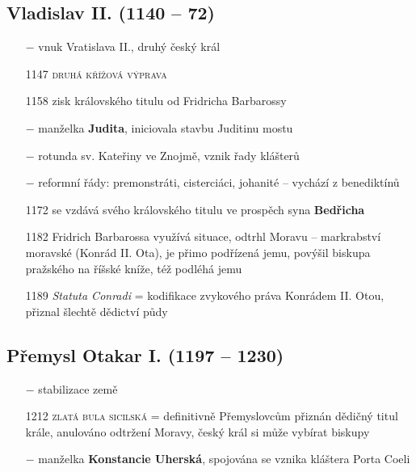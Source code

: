 \documentclass{article}
\begin{document}
\subsection*{Vladislav II. (1140 -- 72)}
\begin{itemize}
    \vspace{-0.5em}
    \setlength\itemsep{0.15em}
    \item[$-$] vnuk Vratislava II., druhý český král
    \item[1147] \textsc{druhá křížová výprava}
    \item[1158] zisk královského titulu od Fridricha Barbarossy
    \item[$-$] manželka \textbf{Judita}, iniciovala stavbu Juditinu mostu
    \item[$-$] rotunda sv. Kateřiny ve Znojmě, vznik řady klášterů
    \item[$-$] reformní řády: premonstráti, cisterciáci, johanité -- vychází z benediktínů
    \item[1172] se vzdává svého královského titulu ve prospěch syna \textbf{Bedřicha}
\end{itemize}

\begin{itemize}
    \vspace{-0.5em}
    \setlength\itemsep{0.15em}
    \item[1182] Fridrich Barbarossa využívá situace, odtrhl Moravu -- markrabství moravské (Konrád II. Ota), je přimo podřízená jemu, povýšil biskupa pražského na říšské kníže, též podléhá jemu
    \item[1189] \textit{Statuta Conradi} = kodifikace zvykového práva Konrádem II. Otou, přiznal šlechtě dědictví půdy
\end{itemize}

\subsection*{Přemysl Otakar I. (1197 -- 1230)}
\begin{itemize}
    \vspace{-0.5em}
    \setlength\itemsep{0.15em}
    \item[$-$] stabilizace země
    \item[1212] \textsc{zlatá bula sicilská} = definitivně Přemyslovcům přiznán dědičný titul krále, anulováno odtržení Moravy, český král si může vybírat biskupy
    \item[$-$] manželka \textbf{Konstancie Uherská}, spojována se vznika kláštera Porta Coeli
\end{itemize}
\end{document}

